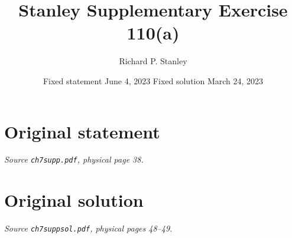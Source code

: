 \documentclass[11pt,a4paper]{article}
\title{Stanley Supplementary Exercise 110(a)}
\author{Richard P. Stanley}
\date{Fixed statement June 4, 2023 \qquad Fixed solution March 24, 2023}
\begin{document}
\maketitle
\section*{Original statement}
\noindent\emph{Source \texttt{ch7supp.pdf}, physical page 38.}\par\medskip

\clearpage
\section*{Original solution}
\noindent\emph{Source \texttt{ch7suppsol.pdf}, physical pages 48--49.}\par\medskip

\end{document}
